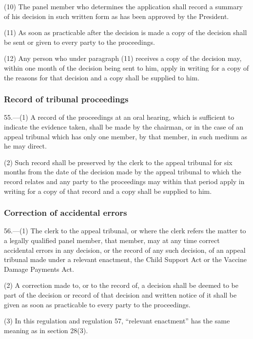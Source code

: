 \documentclass[12pt,a4paper]{article}
\begin{document}
(10) The panel member who determines the application shall record a summary of his decision in such written form as has been approved by the President.

(11) As soon as practicable after the decision is made a copy of the decision shall be sent or given to every party to the proceedings.

(12) Any person who under paragraph (11) receives a copy of the decision may, within one month of the decision being sent to him, apply in writing for a copy of the reasons for that decision and a copy shall be supplied to him.

\subsubsection[55. Record of tribunal proceedings]{Record of tribunal proceedings}

55.—(1) A record of the proceedings at an oral hearing, which is sufficient to indicate the evidence taken, shall be made by the chairman, or in the case of an appeal tribunal which has only one member, by that member, in such medium as he may direct.

(2) Such record shall be preserved by the clerk to the appeal tribunal for six months from the date of the decision made by the appeal tribunal to which the record relates and any party to the proceedings may within that period apply in writing for a copy of that record and a copy shall be supplied to him.

\subsubsection[56. Correction of accidental errors]{Correction of accidental errors}

56.—(1) The clerk to the appeal tribunal, or where the clerk refers the matter to a legally qualified panel member, that member, may at any time correct accidental errors in any decision, or the record of any such decision, of an appeal tribunal made under a relevant enactment, the Child Support Act or the Vaccine Damage Payments Act.

(2) A correction made to, or to the record of, a decision shall be deemed to be part of the decision or record of that decision and written notice of it shall be given as soon as practicable to every party to the proceedings.

(3) In this regulation and regulation 57, “relevant enactment” has the same meaning as in section 28(3).
\end{document}
